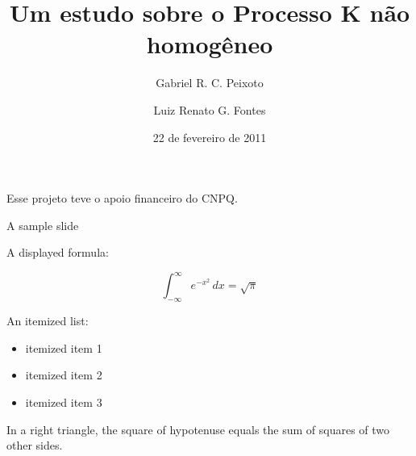 \documentclass[xcolor=dvipsnames]{beamer}
\title{Um estudo sobre o Processo K não homogêneo}
\author{Gabriel R. C. Peixoto \and Luiz Renato G. Fontes}
\date{22 de fevereiro de 2011}
\begin{document}
\begin{frame}[plain]
  \titlepage
  
  \begin{center}
    Esse projeto teve o apoio financeiro do CNPQ.
  \end{center}
\end{frame}

\begin{frame}{A sample slide}

A displayed formula:

\[
  \int_{-\infty}^\infty e^{-x^2} \, dx = \sqrt{\pi}
\]

An itemized list:

\begin{itemize}
  \item itemized item 1
  \item itemized item 2
  \item itemized item 3
\end{itemize}

\begin{theorem}
  In a right triangle, the square of hypotenuse equals
  the sum of squares of two other sides.
\end{theorem}

\end{frame}
\end{document}
